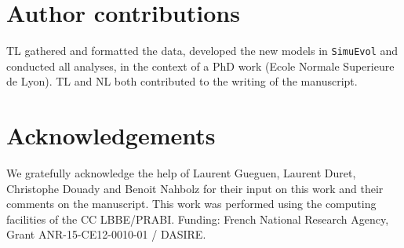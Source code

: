 \documentclass{article}
\begin{document}
\section{Author contributions}
TL gathered and formatted the data, developed the new models in \texttt{SimuEvol} and conducted all analyses, in the context of a PhD work (Ecole Normale Superieure de Lyon).
TL and NL both contributed to the writing of the manuscript.

\section{Acknowledgements}
We gratefully acknowledge the help of Laurent Gueguen, Laurent Duret, Christophe Douady and Benoit Nahbolz for their input on this work and their comments on the manuscript.
This work was performed using the computing facilities of the CC LBBE/PRABI.
Funding: French National Research Agency, Grant ANR-15-CE12-0010-01 / DASIRE.


\end{document}
